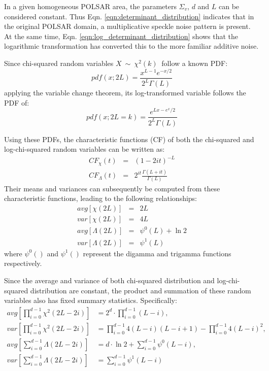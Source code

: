 \documentclass[journal]{IEEEtran}
\begin{document}
In a given homogeneous POLSAR area, the parameters $\Sigma_v$, $d$ and $L$ can be considered constant.
Thus Eqn. \ref{eqn:determinant_distribution} indicates that 
  in the original POLSAR domain, a multiplicative speckle noise pattern is present.
At the same time, Eqn. \ref{eqn:log_determinant_distribution} shows that
  the logarithmic transformation has converted this to the more familiar additive noise.  

Since chi-squared random variables $X\ \sim\ \chi^2(k)\ $ follow a known PDF:
\begin{equation}
pdf(x;2L) =
  \frac{x^{L-1} e^{-x/2}}{2^L \Gamma\left(L\right)}
\label{eqn:chi_squared_dist_pdf:chap4}
\end{equation}
applying the variable change theorem, 
  its log-transformed variable follows the PDF of:
\begin{equation}
  pdf(x;2L=k) = \frac{e^{Lx-e^x/2}}{2^{L}\Gamma(L)}
\end{equation}

Using these PDFs, the characteristic functions (CF) of both the chi-squared and log-chi-squared random variables
  can be written as:
  \begin{eqnarray}
    CF_\chi(t) &=& (1-2it)^{−L} \\ 
    CF_\Lambda(t) &=& 2^{it} \frac{\Gamma(L+it)}{\Gamma(L)} \label{eqn:log_chi_squared_characteristic_function}
  \end{eqnarray}
 Their means and variances can subsequently be computed from these  characteristic functions, leading to the following relationships:  
  \begin{eqnarray}
    avg \left[ \chi(2L) \right]&=&2L \\
var \left[ \chi(2L) \right]&=&4L \\
avg \left[ \Lambda(2L) \right] &=& \psi^0(L) + \ln2 \\
var \left[ \Lambda(2L) \right] &=& \psi^1(L)
  \end{eqnarray}
  where $\psi^0()$ and $\psi^1()$ represent the digamma and trigamma functions respectively.

Since the average and variance of both chi-squared distribution and log-chi-squared distribution are constant,
  the product and summation of these random variables also has fixed summary statistics.
Specifically:
\begin{align*}
  avg \left[ \prod^{d-1}_{i=0} \chi^2(2L-2i) \right] &= 2^d \cdot \prod^{d-1}_{i=0} (L-i), \\
  var \left[ \prod^{d-1}_{i=0} \chi^2(2L-2i) \right] &= \prod^{d-1}_{i=0} 4(L-i)(L-i+1) - \prod^{d-1}_{i=0} 4(L-i)^2, \\
  avg \left[ \sum^{d-1}_{i=0} \Lambda(2L-2i) \right] &= d \cdot \ln{2} + \sum^{d-1}_{i=0} \psi^0(L-i), \\
  var \left[ \sum^{d-1}_{i=0} \Lambda(2L-2i) \right] &= \sum^{d-1}_{i=0} \psi^1(L-i)
\end{align*}
\end{document}
